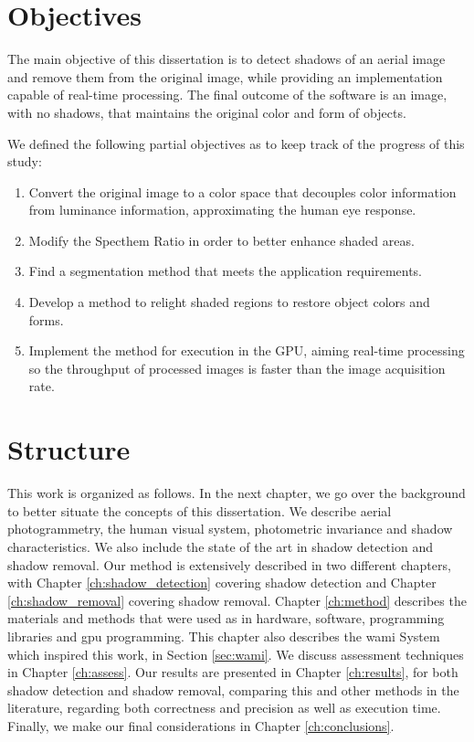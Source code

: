 \section{Objectives} \label{sec:objectives}
The main objective of this dissertation is to detect shadows of an aerial image and remove them from the original image, while providing an implementation capable of real-time processing. The final outcome of the software is an image, with no shadows, that maintains the original color and form of objects.

We defined the following partial objectives as to keep track of the progress of this study:
\begin{enumerate}
\item Convert the original image to a color space that decouples color information from luminance information, approximating the human eye response.
\item Modify the Specthem Ratio in order to better enhance shaded areas.
\item Find a segmentation method that meets the application requirements.
\item Develop a method to relight shaded regions to restore object colors and forms.
\item Implement the method for execution in the GPU, aiming real-time processing so the throughput of processed images is faster than the image acquisition rate.
\end{enumerate}

\section{Structure}
This work is organized as follows. In the next chapter, we go over the background to better situate the concepts of this dissertation. We describe aerial photogrammetry, the human visual system, photometric invariance and shadow characteristics. We also include the state of the art in shadow detection and shadow removal. Our method is extensively described in two different chapters, with Chapter \ref{ch:shadow_detection} covering shadow detection and Chapter \ref{ch:shadow_removal} covering shadow removal. Chapter \ref{ch:method} describes the materials and methods that were used as in hardware, software, programming libraries and \gls{gpu} programming. This chapter also describes the \gls{wami} System which inspired this work, in Section \ref{sec:wami}. We discuss assessment techniques in Chapter \ref{ch:assess}. Our results are presented in Chapter \ref{ch:results}, for both shadow detection and shadow removal, comparing this and other methods in the literature, regarding both correctness and precision as well as execution time. Finally, we make our final considerations in Chapter \ref{ch:conclusions}.
